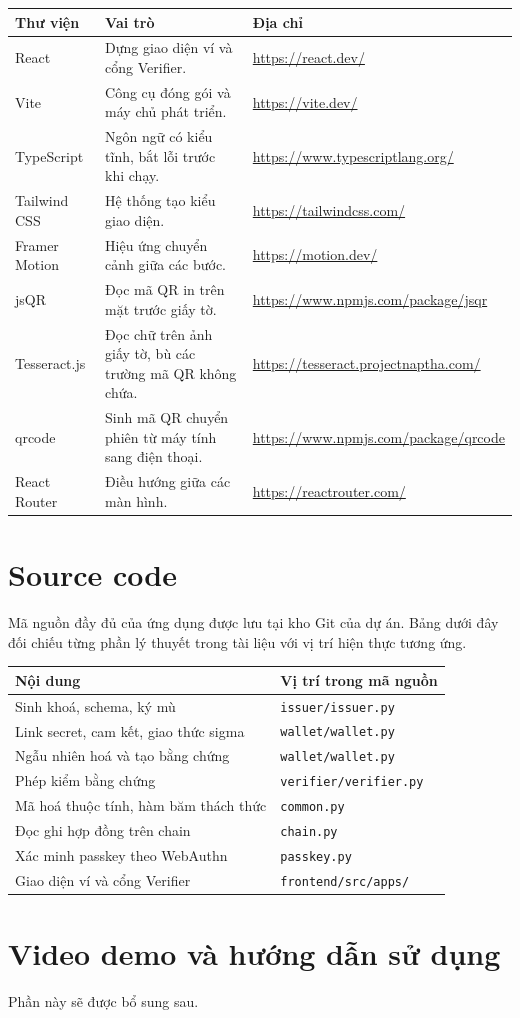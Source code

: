 \documentclass[a4paper,11pt,oneside]{report}
\theoremstyle{definition}
\theoremstyle{plain}
\begin{document}
\begin{longtable}{@{}p{2.8cm}p{6.4cm}p{4.6cm}@{}}
\toprule
\textbf{\sffamily Thư viện} & \textbf{\sffamily Vai trò} & \textbf{\sffamily Địa chỉ} \\
\midrule
\endhead
React & Dựng giao diện ví và cổng Verifier. & \url{https://react.dev/} \\
\addlinespace
Vite & Công cụ đóng gói và máy chủ phát triển. & \url{https://vite.dev/} \\
\addlinespace
TypeScript & Ngôn ngữ có kiểu tĩnh, bắt lỗi trước khi chạy. & \url{https://www.typescriptlang.org/} \\
\addlinespace
Tailwind CSS & Hệ thống tạo kiểu giao diện. & \url{https://tailwindcss.com/} \\
\addlinespace
Framer Motion & Hiệu ứng chuyển cảnh giữa các bước. & \url{https://motion.dev/} \\
\addlinespace
jsQR & Đọc mã QR in trên mặt trước giấy tờ. & \url{https://www.npmjs.com/package/jsqr} \\
\addlinespace
Tesseract.js & Đọc chữ trên ảnh giấy tờ, bù các trường mã QR không chứa. & \url{https://tesseract.projectnaptha.com/} \\
\addlinespace
qrcode & Sinh mã QR chuyển phiên từ máy tính sang điện thoại. & \url{https://www.npmjs.com/package/qrcode} \\
\addlinespace
React Router & Điều hướng giữa các màn hình. & \url{https://reactrouter.com/} \\
\bottomrule
\end{longtable}

\chapter{Source code}

Mã nguồn đầy đủ của ứng dụng được lưu tại kho Git của dự án. Bảng dưới đây đối chiếu từng phần lý
thuyết trong tài liệu với vị trí hiện thực tương ứng.

\begin{center}
\begin{tabular}{@{}p{6.2cm}p{7.4cm}@{}}
\toprule
\textbf{\sffamily Nội dung} & \textbf{\sffamily Vị trí trong mã nguồn} \\
\midrule
Sinh khoá, schema, ký mù & \texttt{issuer/issuer.py} \\
Link secret, cam kết, giao thức sigma & \texttt{wallet/wallet.py} \\
Ngẫu nhiên hoá và tạo bằng chứng & \texttt{wallet/wallet.py} \\
Phép kiểm bằng chứng & \texttt{verifier/verifier.py} \\
Mã hoá thuộc tính, hàm băm thách thức & \texttt{common.py} \\
Đọc ghi hợp đồng trên chain & \texttt{chain.py} \\
Xác minh passkey theo WebAuthn & \texttt{passkey.py} \\
Giao diện ví và cổng Verifier & \texttt{frontend/src/apps/} \\
\bottomrule
\end{tabular}
\end{center}

\chapter{Video demo và hướng dẫn sử dụng}

{\color{muted} Phần này sẽ được bổ sung sau.}
\end{document}
